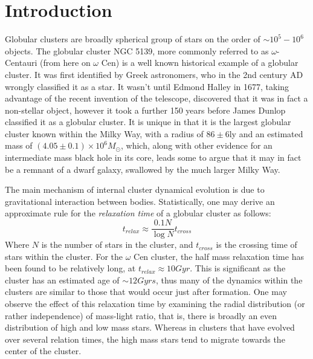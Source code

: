 \documentclass[aps,
                pra,  
                a4paper, 
                amsmath, 
                amssymb, 
                preprint,
                tightenlines,  
                amsfonts,
                nofootinbib,
                notitlepage
            ]{revtex4-2}
\begin{document}
\section{Introduction}
Globular clusters are broadly spherical group of stars on the order of $\sim10^5-10^6$ objects. The globular cluster NGC 5139, more commonly referred to as $\omega$-Centauri (from here on $\omega$ Cen) is a well known historical example of a globular cluster. It was first identified by Greek astronomers, who in the 2nd century AD wrongly classified it as a star. It wasn't until Edmond Halley in 1677, taking advantage of the recent invention of the telescope, discovered that it was in fact a non-stellar object, however it took a further 150 years before James Dunlop classified it as a globular cluster. It is unique in that it is the largest globular cluster known within the Milky Way, with a radius of $86\pm6$ly and an estimated mass of $(4.05\pm0.1)\times10^6M_{\odot}$, which, along with other evidence for an intermediate mass black hole in its core, leads some to argue that it may in fact be a remnant of a dwarf galaxy, swallowed by the much larger Milky Way.
\par
The main mechanism of internal cluster dynamical evolution is due to gravitational interaction between bodies. Statistically, one may derive an approximate rule for the \textit{relaxation time} of a globular cluster as follows\cite{Yan2008}:
\begin{equation}
    t_{relax}\approx\frac{0.1N}{\log{N}}t_{cross}
\end{equation}
Where $N$ is the number of stars in the cluster, and $t_{cross}$ is the crossing time of stars within the cluster. For the $\omega$ Cen cluster, the half mass relaxation time has been found to be relatively long, at $t_{relax}\approx 10Gyr$. This is significant as the cluster has an estimated age of $\sim 12Gyrs$, thus many of the dynamics within the clusters are similar to those that would occur just after formation. One may observe the effect of this relaxation time by examining the radial distribution (or rather independence) of mass-light ratio, that is, there is broadly an even distribution of high and low mass stars. Whereas in clusters that have evolved over several relation times, the high mass stars tend to migrate towards the center of the cluster\cite{Yan2008}.
\par
\end{document}
